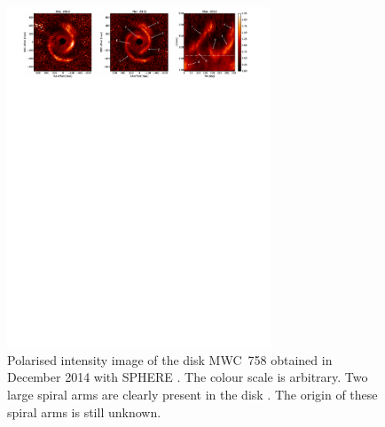 \begin{figure}
    \centering
    \includegraphics[width = 0.7\textwidth]{figures/mwc758.pdf}
    \caption{Polarised intensity image of the disk MWC~758 obtained in December 2014 with SPHERE \citep[e.g.][]{beuzit2019}. The colour scale is arbitrary. Two large spiral arms are clearly present in the disk \citep{benisty2015}. The origin of these spiral arms is still unknown.}
    \label{fig:mwc758}
\end{figure}


